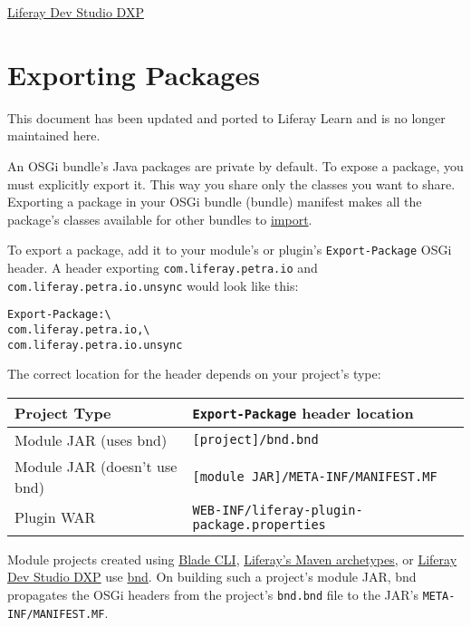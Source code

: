 \href{/docs/7-2/reference/-/knowledge_base/r/liferay-dev-studio}{Liferay
Dev Studio DXP}

\chapter{Exporting Packages}\label{exporting-packages}

{ This document has been updated and ported to Liferay Learn and is no
longer maintained here.}

An OSGi bundle's Java packages are private by default. To expose a
package, you must explicitly export it. This way you share only the
classes you want to share. Exporting a package in your OSGi bundle
(bundle) manifest makes all the package's classes available for other
bundles to
\href{/docs/7-2/customization/-/knowledge_base/c/importing-packages}{import}.

To export a package, add it to your module's or plugin's
\texttt{Export-Package} OSGi header. A header exporting
\texttt{com.liferay.petra.io} and \texttt{com.liferay.petra.io.unsync}
would look like this:

\begin{verbatim}
Export-Package:\
com.liferay.petra.io,\
com.liferay.petra.io.unsync
\end{verbatim}

The correct location for the header depends on your project's type:

\noindent\hrulefill

\begin{longtable}[]{@{}ll@{}}
\toprule\noalign{}
Project Type & \texttt{Export-Package} header location \\
\midrule\noalign{}
\endhead
\bottomrule\noalign{}
\endlastfoot
Module JAR (uses bnd) & \texttt{{[}project{]}/bnd.bnd} \\
Module JAR (doesn't use bnd) &
\texttt{{[}module\ JAR{]}/META-INF/MANIFEST.MF} \\
Plugin WAR & \texttt{WEB-INF/liferay-plugin-package.properties} \\
\end{longtable}

\noindent\hrulefill

Module projects created using
\href{/docs/7-2/reference/-/knowledge_base/r/blade-cli}{Blade CLI},
\href{/docs/7-2/reference/-/knowledge_base/r/maven}{Liferay's Maven
archetypes}, or
\href{/docs/7-2/reference/-/knowledge_base/r/liferay-dev-studio}{Liferay
Dev Studio DXP} use \href{http://bnd.bndtools.org/}{bnd}. On building
such a project's module JAR, bnd propagates the OSGi headers from the
project's \texttt{bnd.bnd} file to the JAR's
\texttt{META-INF/MANIFEST.MF}.


